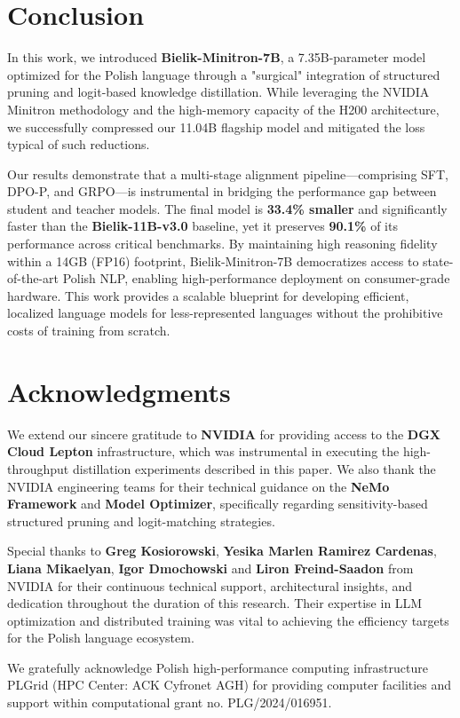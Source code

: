 \documentclass{article}
\begin{document}
\section{Conclusion}
In this work, we introduced \textbf{Bielik-Minitron-7B}, a 7.35B-parameter model optimized for the Polish language through a "surgical" integration of structured pruning and logit-based knowledge distillation. While leveraging the NVIDIA Minitron methodology and the high-memory capacity of the H200 architecture, we successfully compressed our 11.04B flagship model and mitigated the loss typical of such reductions. 

Our results demonstrate that a multi-stage alignment pipeline—comprising SFT, DPO-P, and GRPO—is instrumental in bridging the performance gap between student and teacher models. The final model is \textbf{33.4\% smaller} and significantly faster than the \textbf{Bielik-11B-v3.0} baseline, yet it preserves \textbf{90.1\%} of its performance across critical benchmarks. By maintaining high reasoning fidelity within a 14GB (FP16) footprint, Bielik-Minitron-7B democratizes access to state-of-the-art Polish NLP, enabling high-performance deployment on consumer-grade hardware. This work provides a scalable blueprint for developing efficient, localized language models for less-represented languages without the prohibitive costs of training from scratch.

\section*{Acknowledgments}
We extend our sincere gratitude to \textbf{NVIDIA} for providing access to the \textbf{DGX Cloud Lepton} infrastructure, which was instrumental in executing the high-throughput distillation experiments described in this paper. We also thank the NVIDIA engineering teams for their technical guidance on the \textbf{NeMo Framework} and \textbf{Model Optimizer}, specifically regarding sensitivity-based structured pruning and logit-matching strategies.

Special thanks to \textbf{Greg Kosiorowski}, \textbf{Yesika Marlen Ramirez Cardenas}, \textbf{Liana Mikaelyan}, \textbf{Igor Dmochowski} and \textbf{Liron Freind-Saadon} from NVIDIA for their continuous technical support, architectural insights, and dedication throughout the duration of this research. Their expertise in LLM optimization and distributed training was vital to achieving the efficiency targets for the Polish language ecosystem.

We gratefully acknowledge Polish high-performance computing infrastructure PLGrid (HPC Center: ACK Cyfronet AGH) for providing computer facilities and support within computational grant no. PLG/2024/016951. 

  

\end{document}
